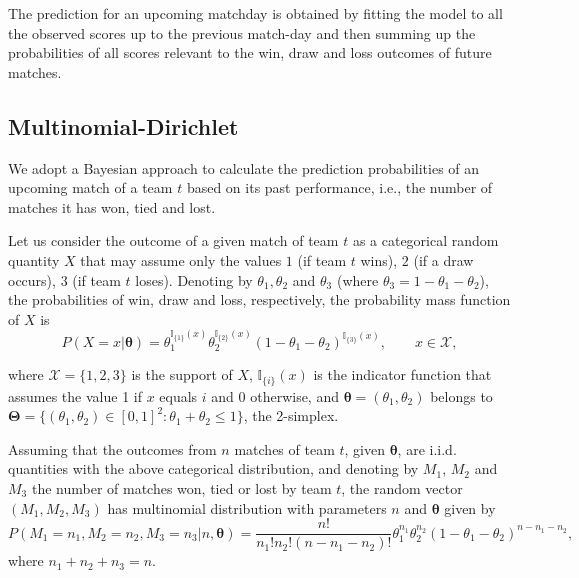 \documentclass[journal,article,accept,moreauthors,pdftex,12pt,a4paper]{mdpi}
\begin{document}
	The prediction for an upcoming matchday is obtained by fitting the
	model to all the observed scores up to the previous match-day and
	then summing up the probabilities of all scores relevant to the win,
	draw and loss outcomes of future matches.
	
	\subsection{Multinomial-Dirichlet}
	\label{sec::Mn_Dir}
	
	We adopt a Bayesian approach to calculate the prediction probabilities of an upcoming match of a team $t$ based on its past performance, i.e., the number of matches it has won, tied and lost.
	
	Let us consider the outcome of a given match of team $t$ as a categorical random quantity $X$ that may assume only the values $1$ (if team $t$ wins), $2$ (if a draw occurs), $3$ (if team $t$ loses).
	Denoting by $\theta_1, \theta_2$ and $\theta_3$ (where $\theta_3 = 1-\theta_1 - \theta_2$), the probabilities of win, draw and loss, respectively, the probability mass function of $X$ is
	\[
	P(X=x | \boldsymbol{\theta}) = \theta_1^{\mathbb{I}_{\{1\}}(x)}
	\theta_2^{\mathbb{I}_{\{2\}}(x)}(1 - \theta_1 -
	\theta_2)^{{\mathbb{I}_{\{3\}}}(x)}, \qquad x \in \mathcal{X},
	\]
	
	\noindent
	where $\mathcal{X}=\{1,2,3\}$ is the support of $X$,
	$\mathbb{I}_{\{i\}}(x)$ is the indicator function that assumes the
	value 1 if $x$ equals $i$ and 0 otherwise, and $\boldsymbol{\theta}
	= (\theta_1, \theta_2)$ belongs to $\boldsymbol{\Theta} =
	\{(\theta_1,\theta_2)\in [0,1]^2: \theta_1+\theta_2 \leq 1 \}$, the 2-simplex.
	
	Assuming that the outcomes from $n$ matches of team $t$, given $\boldsymbol{\theta}$, are i.i.d. quantities with the above categorical distribution, and denoting by $M_1$, $M_2$ and $M_3$ the number of matches won, tied or lost by team $t$, the random vector $(M_1, M_2, M_3)$ has multinomial distribution with parameters $n$ and $\boldsymbol{\theta}$ given by
	\[
	P(M_1=n_1,M_2=n_2,M_3=n_3| n, \boldsymbol{\theta})=
	\frac{n!}{n_1!n_2!(n-n_1-n_2)!}\theta_1^{n_1}\theta_2^{n_2}(1-\theta_1-\theta_2)^{n-n_1-n_2},
	\]
	\noindent
	where $n_1 + n_2 + n_3 = n$.
	
\end{document}

